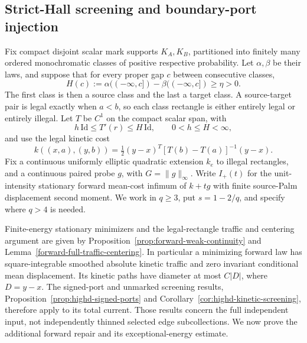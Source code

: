 \documentclass[11pt,reqno]{amsart}
\theoremstyle{definition}
\theoremstyle{remark}
\numberwithin{equation}{section}
\begin{document}
\subsection{Strict-Hall screening and boundary-port injection}
\label{strict-screen-section}

Fix compact disjoint scalar mark supports \(K_A,K_B\), partitioned into
finitely many ordered monochromatic classes of positive respective
probability. Let \(\alpha,\beta\) be their laws, and suppose that for every
proper gap \(c\) between consecutive classes,
\begin{equation}
\label{strict-screen-hall}
 H(c):=\alpha((-\infty,c])-\beta((-\infty,c])\ge\eta>0.
\end{equation}
The first class is then a source class and the last a target class.
A source-target pair is legal exactly when \(a<b\), so each class
rectangle is either entirely legal or entirely illegal. Let \(T\) be
\(C^1\) on the compact scalar span, with
\[
 h\,\mathrm{Id}\le T'(r)\le H\,\mathrm{Id},\qquad 0<h\le H<\infty,
\]
and use the legal kinetic cost
\[
 k((x,a),(y,b))
   =\tfrac12(y-x)^T[T(b)-T(a)]^{-1}(y-x).
\]
Fix a continuous uniformly elliptic quadratic extension \(k_e\) to illegal
rectangles, and a continuous paired probe \(g\), with \(G=\|g\|_\infty\).
Write \(I_+(t)\) for the unit-intensity stationary forward mean-cost
infimum of \(k+tg\) with finite source-Palm displacement second moment.
We work in \(q\ge3\), put \(s=1-2/q\), and specify where \(q>4\) is needed.

Finite-energy stationary minimizers and the legal-rectangle traffic and
centering argument are given by
Proposition~\ref{prop:forward-weak-continuity} and
Lemma~\ref{forward-full-traffic-centering}. In particular a minimizing
forward law has square-integrable smoothed absolute kinetic traffic and
zero invariant conditional mean displacement. Its kinetic paths have
diameter at most \(C|D|\), where \(D=y-x\). The signed-port and unmarked
screening results, Proposition~\ref{prop:highd-signed-ports} and
Corollary~\ref{cor:highd-kinetic-screening}, therefore apply to its total
current. Those results concern the full independent input, not
independently thinned selected edge subcollections. We now prove the
additional forward repair and its exceptional-energy estimate.
\end{document}
